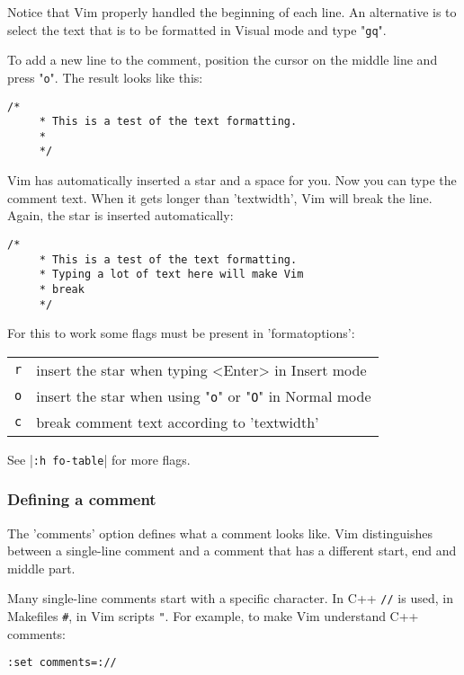 Notice that Vim properly handled the beginning of each line.
An alternative is to select the text that is to be formatted in Visual mode and type "\verb!gq!".

To add a new line to the comment, position the cursor on the middle line and press "\verb!o!".
The result looks like this:

\begin{Verbatim}[samepage=true]
    /* 
     * This is a test of the text formatting. 
     * 
     */ 
\end{Verbatim}

Vim has automatically inserted a star and a space for you.
Now you can type the comment text.
When it gets longer than 'textwidth', Vim will break the line.
Again, the star is inserted automatically:

\begin{Verbatim}[samepage=true]
    /* 
     * This is a test of the text formatting. 
     * Typing a lot of text here will make Vim 
     * break 
     */ 
\end{Verbatim}

For this to work some flags must be present in 'formatoptions':

\begin{center} \begin{tabular}{c l}
\verb!r! & insert the star when typing <Enter> in Insert mode \\
\verb!o! & insert the star when using "\verb!o!" or "\verb!O!" in Normal mode \\
\verb!c! & break comment text according to 'textwidth' \\
\end{tabular} \end{center}

See |\verb!:h fo-table!| for more flags.

\subsubsection{Defining a comment}
The 'comments' option defines what a comment looks like.
Vim distinguishes between a single-line comment and a comment that has a different start, end and middle part.

Many single-line comments start with a specific character.
In C++ \verb!//! is used, in Makefiles \verb!#!, in Vim scripts \verb!"!.
For example, to make Vim understand C++ comments:

\begin{Verbatim}[samepage=true]
 :set comments=://
\end{Verbatim}

